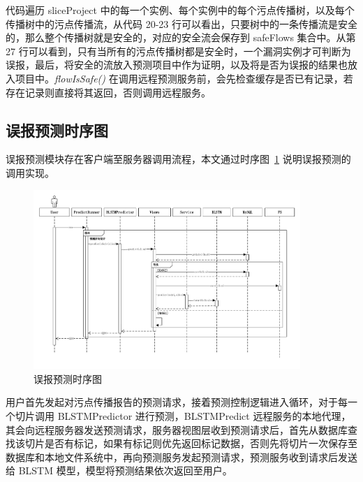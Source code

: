 代码遍历 sliceProject 中的每一个实例、每个实例中的每个污点传播树，以及每个传播树中的污点传播流，从代码 20-23 行可以看出，只要树中的一条传播流是安全的，那么整个传播树就是安全的，对应的安全流会保存到 safeFlows 集合中。从第 27 行可以看到，只有当所有的污点传播树都是安全时，一个漏洞实例才可判断为误报，最后，将安全的流放入预测项目中作为证明，以及将是否为误报的结果也放入项目中。\textit{flowIsSafe()} 在调用远程预测服务前，会先检查缓存是否已有记录，若存在记录则直接将其返回，否则调用远程服务。\\

\vspace{1cm}
\subsection{误报预测时序图}
误报预测模块存在客户端至服务器调用流程，本文通过时序图~\ref{predictTime} 说明误报预测的调用实现。

\begin{figure}[!htb]
    \centering
    \includegraphics[width=0.9\textwidth]{FIGs/chapter4/predictTime.pdf}
        \vspace{-1cm}
    \caption{误报预测时序图}\label{predictTime}
\end{figure}

用户首先发起对污点传播报告的预测请求，接着预测控制逻辑进入循环，对于每一个切片调用 BLSTMPredictor 进行预测，BLSTMPredict 远程服务的本地代理，其会向远程服务器发送预测请求，服务器视图层收到预测请求后，首先从数据库查找该切片是否有标记，如果有标记则优先返回标记数据，否则先将切片一次保存至数据库和本地文件系统中，再向预测服务发起预测请求，预测服务收到请求后发送给 BLSTM 模型，模型将预测结果依次返回至用户。\\

\vspace{2cm}
